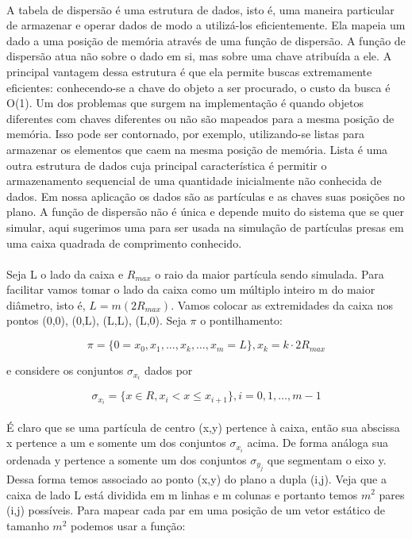 \documentclass[a4paper,11pt]{article}
\begin{document}
\paragraph{}A tabela de dispersão é uma estrutura de dados,
isto é, uma maneira particular de armazenar e
operar dados de modo a utilizá-los eficientemente. Ela
mapeia um dado a uma posição de memória através de uma
função de dispersão. A função de dispersão atua não sobre o
dado em si, mas sobre uma chave atribuída a ele. A principal
vantagem dessa estrutura é que ela permite buscas
extremamente eficientes: conhecendo-se a chave do objeto a
ser procurado, o custo da busca é O(1). Um dos problemas que
surgem na implementação é quando objetos diferentes com
chaves diferentes ou não são mapeados para a mesma posição de
memória. Isso pode ser contornado, por exemplo,
utilizando-se listas para armazenar os elementos que caem na
mesma posição de memória. Lista é uma outra estrutura de
dados cuja principal característica é permitir o
armazenamento sequencial de uma quantidade inicialmente não conhecida
de dados. Em nossa aplicação os dados são as partículas e 
as chaves suas posições no plano. A função de dispersão não
é única e depende muito do sistema que se quer simular, aqui
sugerimos uma para ser usada na simulação de partículas presas
em uma caixa quadrada de comprimento conhecido.

\paragraph{} Seja L o lado da caixa e $R_{max}$ o raio da maior partícula
sendo simulada. Para facilitar vamos tomar o lado da caixa como um múltiplo
inteiro m do maior diâmetro, isto é, $ L = m(2R_{max})$. Vamos colocar as 
extremidades da caixa nos pontos (0,0), (0,L), (L,L), (L,0). Seja $\pi$ o 
pontilhamento:

\begin{displaymath}
  \pi = \{ 0 = x_0, x_1, \ldots, x_k, \ldots, x_{m} = L \}, x_k = k\cdot2R_{max} 
\end{displaymath}

e considere os conjuntos $\sigma_{x_i}$ dados por 

\begin{displaymath}
\sigma_{x_i} = \{x \in R, x_i < x \leq x_{i+1}\}, i = 0,1,\ldots, m-1
\end{displaymath}

\paragraph{}É claro que se uma partícula de centro (x,y) pertence à 
caixa, então sua abscissa x pertence a um e somente um dos conjuntos
$\sigma_{x_i}$ acima. De forma análoga sua ordenada y pertence a somente um dos
conjuntos $\sigma_{y_j}$ que segmentam o eixo y. Dessa forma temos associado ao
ponto (x,y) do plano a dupla (i,j). Veja que a caixa de lado L está dividida em 
m linhas e m colunas e portanto temos $m^2$ pares (i,j) possíveis. Para mapear
cada par em uma posição de um vetor estático de tamanho $m^2$ podemos usar
a função:
\end{document}

